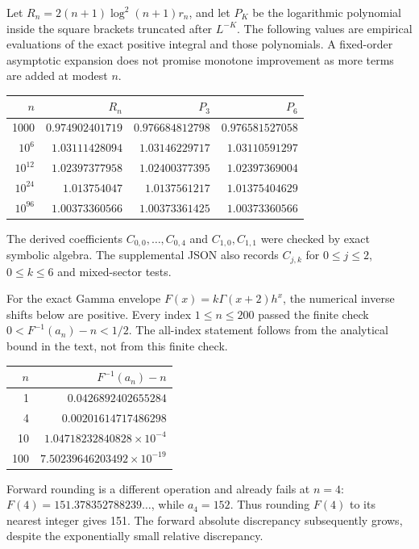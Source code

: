 Let $R_n=2(n+1)\log^2(n+1)r_n$, and let $P_K$ be the logarithmic polynomial
inside the square brackets truncated after $L^{-K}$. The following values
are empirical evaluations of the exact positive integral and those
polynomials. A fixed-order asymptotic expansion does not promise monotone
improvement as more terms are added at modest $n$.
\begin{center}
\begin{tabular}{rrrr}
\toprule
$n$ & $R_n$ & $P_3$ & $P_6$ \\
\midrule
1000 & $0.974902401719$ & $0.976684812798$ & $0.976581527058$ \\
$10^{6}$ & $1.03111428094$ & $1.03146229717$ & $1.03110591297$ \\
$10^{12}$ & $1.02397377958$ & $1.02400377395$ & $1.02397369004$ \\
$10^{24}$ & $1.013754047$ & $1.0137561217$ & $1.01375404629$ \\
$10^{96}$ & $1.00373360566$ & $1.00373361425$ & $1.00373360566$ \\
\bottomrule
\end{tabular}
\end{center}
The derived coefficients $C_{0,0},\ldots,C_{0,4}$ and $C_{1,0},C_{1,1}$
were checked by exact symbolic algebra. The supplemental JSON also records
$C_{j,k}$ for $0\le j\le2$, $0\le k\le6$ and mixed-sector tests.

For the exact Gamma envelope $F(x)=k\Gamma(x+2)h^x$, the numerical inverse
shifts below are positive. Every index $1\le n\le200$ passed the finite
check $0<F^{-1}(a_n)-n<1/2$. The all-index statement follows from the
analytical bound in the text, not from this finite check.
\begin{center}
\begin{tabular}{rr}
\toprule
$n$ & $F^{-1}(a_n)-n$ \\
\midrule
1 & $0.0426892402655284$ \\
4 & $0.00201614717486298$ \\
10 & $1.04718232840828\times10^{-4}$ \\
100 & $7.50239646203492\times10^{-19}$ \\
\bottomrule
\end{tabular}
\end{center}
Forward rounding is a different operation and already fails at $n=4$:
$F(4)=151.378352788239\ldots$, while $a_4=152$. Thus rounding $F(4)$ to
its nearest integer gives 151. The forward absolute discrepancy subsequently
grows, despite the exponentially small relative discrepancy.

